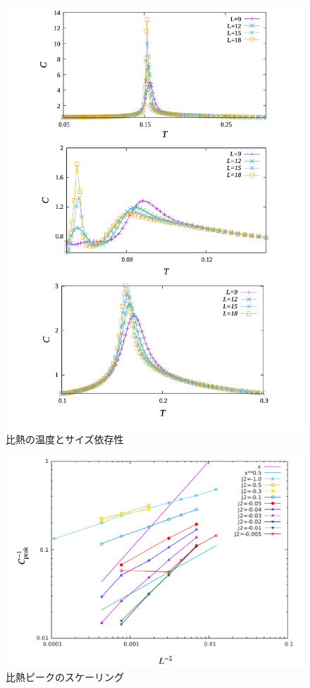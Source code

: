\documentclass[12pt,titlepage,dvipdfmx]{jarticle}
\begin{document}
\begin{figure}[tbh]
   \centering
   \includegraphics[width=15cm]{figure/specific_heat.pdf}
   \caption{比熱の温度とサイズ依存性}
\end{figure}

\begin{figure}[tbh]
   \centering
   \includegraphics[width=15cm]{figure/cpeak_scaling.pdf}
   \caption{比熱ピークのスケーリング}
\end{figure}
\end{document}
